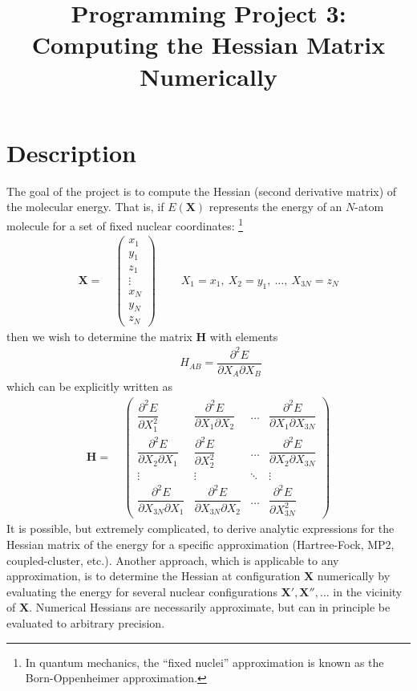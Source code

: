 \documentclass[11pt]{article}
\title{Programming Project 3: Computing the Hessian Matrix Numerically}
\date{}
\newcommand{\bo}[1]{\ensuremath{\mathbf{#1}}}
\renewcommand{\sp}{\ \ \ \ \ \ \ \ \ \ }
\newcommand{\pt}{\partial}
\newcommand{\fr}[2]{\dfrac{#1}{#2}}
\newcommand{\ma}[1]{\left(\begin{matrix}#1\end{matrix}\right)}
\begin{document}
\maketitle

\section*{Description}

The goal of the project is to compute the Hessian (second derivative matrix) of the molecular energy.
That is, if $E(\bo{X})$ represents the energy of an $N$-atom molecule for a set of fixed nuclear coordinates: \footnote{In quantum mechanics, the ``fixed nuclei'' approximation is known as the Born-Oppenheimer approximation.}
\begin{align}
	\bo{X} =&\ \ma{x_1\\y_1\\z_1\\\vdots\\x_N\\y_N\\z_N}\sp
	X_1=x_1,\ X_2=y_1,\ \ldots,\ X_{3N}=z_N
\end{align}
then we wish to determine the matrix $\bo{H}$ with elements
\begin{align}
	\sp H_{AB} = \fr{\pt^2E}{\pt X_A\pt X_B}
\end{align}
which can be explicitly written as
\begin{align}
	\bo{H} =&\ 
	\ma{
		\fr{\pt^2E}{\pt X_1^2}&\fr{\pt^2E}{\pt X_1\pt X_2}&\ldots&\fr{\pt^2E}{\pt X_1\pt X_{3N}}\\
		\fr{\pt^2E}{\pt X_2\pt X_1}&\fr{\pt^2E}{\pt X_2^2}&\ldots&\fr{\pt^2E}{\pt X_2\pt X_{3N}}\\
		\vdots&\vdots&\ddots&\vdots\\
		\fr{\pt^2E}{\pt X_{3N}\pt X_1}&\fr{\pt^2E}{\pt X_{3N}\pt X_2}&\ldots&\fr{\pt^2E}{\pt X_{3N}^2}}
	\label{H}
\end{align}
It is possible, but extremely complicated, to derive analytic expressions for the Hessian matrix of the energy for a specific approximation (Hartree-Fock, MP2, coupled-cluster, etc.).
Another approach, which is applicable to any approximation, is to determine the Hessian at configuration $\bo{X}$ numerically by evaluating the energy for several nuclear configurations $\bo{X}',\bo{X}'',\ldots$ in the vicinity of $\bo{X}$.
Numerical Hessians are necessarily approximate, but can in principle be evaluated to arbitrary precision.
\end{document}
